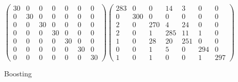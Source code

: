 \documentclass{article}
\begin{document}
	\begin{figure}[H]
	\begin{equation}
	\begin{pmatrix}
	30 & 0 & 0 & 0 & 0 & 0 & 0\\
	0 & 30 & 0 & 0 & 0 & 0 & 0\\
	0 & 0 & 30 & 0 & 0 & 0 & 0\\
	0 & 0 & 0 & 30 & 0 & 0 & 0\\
	0 & 0 & 0 & 0 & 30 & 0 & 0\\
	0 & 0 & 0 & 0 & 0 & 30 & 0\\
	0 & 0 & 0 & 0 & 0 & 0 & 30
	\end{pmatrix}
	\begin{pmatrix}
	283 & 0 & 0 & 14 & 3 & 0 & 0\\
	0 & 300 & 0 & 0 & 0 & 0 & 0\\
	2 & 0 & 270 & 4 & 24 & 0 & 0\\
	2 & 0 & 1 & 285 & 11 & 1 & 0\\
	1 & 0 & 28 & 20 & 251 & 0 & 0\\
	0 & 0 & 1 & 5 & 0 & 294 & 0\\
	1 & 0 & 1 & 0 & 0 & 1 & 297
	\end{pmatrix}
	\end{equation}
	\caption{Boosting}
	\end{figure}
\end{document}
